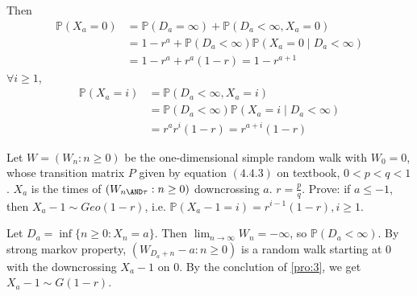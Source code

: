 \documentclass{ctexart}
\begin{document}
\begin{solution}
\begin{enumerate}
      Then \[
        \begin{aligned}
          \mathbb{P}(X_a=0) & =\mathbb{P}(D_a=\infty) + \mathbb{P}(D_a < \infty, X_a=0)            \\
                            & =1-r^a + \mathbb{P}(D_a < \infty)\mathbb{P}(X_a=0 \mid D_a < \infty) \\
                            & =1-r^a + r^a(1-r)=1-r^{a + 1}
        \end{aligned}
      \]
      \(\forall i \geq 1\),
      \[
        \begin{aligned}
          \mathbb{P}(X_a=i) & =\mathbb{P}(D_a< \infty,X_a=i)                                    \\
                            & =    \mathbb{P}(D_a< \infty)\mathbb{P}(X_a = i \mid D_a < \infty) \\
                            & =r^ar^i(1-r)=r^{a + i}(1-r)
        \end{aligned}
      \]
  \end{enumerate}
\end{solution}
\begin{problem}\label{pro:4}
  Let \(W=(W_n:n \geq 0)\) be the one-dimensional simple random walk with \(W_0=0\), whose transition matrix \(P\) given by equation \((4.4.3)\)
  on textbook, \(0< p<q<1\).
  \(X_a\) is the times of \((W_{n \AND \tau}:n \geq 0)\) downcrossing \(a\).
  \(r=\frac{p}{q}\).
  Prove: if \(a \leq -1\), then \(X_a-1 \sim Geo(1-r)\), i.e. \(\mathbb{P}(X_a-1=i)=r^{i-1}(1-r),i \geq 1\).
\end{problem}
\begin{solution}
  Let \(D_a= \inf \{n \geq 0: X_n=a\}\). Then \(\lim_{n \to \infty}W_n = -\infty\), so \(\mathbb{P}(D_a < \infty)\).
  By strong markov property, \((W_{D_a + n}-a: n \geq 0)\) is a random walk starting at \(0\) with the downcrossing \(X_a-1\) on \(0\).
  By the conclution of \ref{pro:3}, we get \(X_{a} -1\sim G(1-r)\).
\end{solution}
\end{document}
